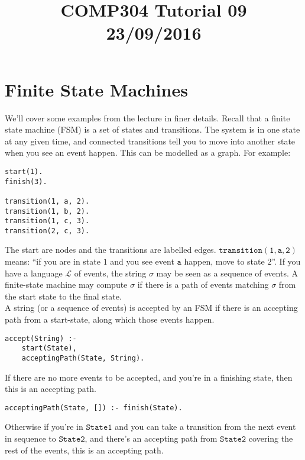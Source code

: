 \documentclass[a4paper,12pt]{article}
\newcommand{\kwa}[1]{\mathtt{#1}}
\begin{document}
\title{COMP304 Tutorial 09 \\ 23/09/2016}
\date{}
\maketitle

\section{Finite State Machines}

We'll cover some examples from the lecture in finer details. Recall that a finite state machine (FSM) is a set of states and transitions. The system is in one state at any given time, and connected transitions tell you to move into another state when you see an event happen. This can be modelled as a graph. For example:

\begin{lstlisting}
start(1).
finish(3).

transition(1, a, 2).
transition(1, b, 2).
transition(1, c, 3).
transition(2, c, 3).
\end{lstlisting}

\noindent
The start are nodes and the transitions are labelled edges. $\kwa{transition(1, a, 2)}$ means: ``if you are in state $1$ and you see event $\kwa{a}$ happen, move to state $2$''. If you have a language $\mathcal{L}$ of events, the string $\sigma$ may be seen as a sequence of events. A finite-state machine may compute $\sigma$ if there is a path of events matching $\sigma$ from the start state to the final state.\\

\noindent
A string (or a sequence of events) is accepted by an FSM if there is an accepting path from a start-state, along which those events happen.

\begin{lstlisting}
accept(String) :-
    start(State),
    acceptingPath(State, String).
\end{lstlisting}

\noindent
If there are no more events to be accepted, and you're in a finishing state, then this is an accepting path.

\begin{lstlisting}
acceptingPath(State, []) :- finish(State).
\end{lstlisting}

\noindent
Otherwise if you're in $\kwa{State1}$ and you can take a transition from the next event in sequence to $\kwa{State2}$, and there's an accepting path from $\kwa{State2}$ covering the rest of the events, this is an accepting path.
\end{document}

